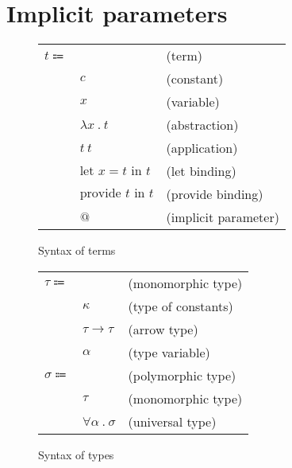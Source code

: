 \documentclass[acmlarge]{acmart}
\begin{document}
\section{Implicit parameters}

  \newcommand\entails[2]{#1 \vdash #2}
  \newcommand\hastype[2]{#1 : #2}
  \newcommand\evalsto[2]{#1 \longrightarrow #2}
  \newcommand\freevars[1]{\text{free} \left( #1 \right)}
  \newcommand\generalize[1]{\overline{\Gamma}\left( #1 \right)}

  \newcommand\labs[2]{\lambda #1 \ . \ #2}
  \newcommand\app[2]{#1 \ #2}
  \newcommand\sub[3]{#1 \left[ #2 \mapsto #3 \right]}
  \newcommand\llet[3]{\text{let } #1 = #2 \text{ in } #3}
  \newcommand\provide[2]{\text{provide } #1 \text{ in } #2}

  \newcommand\larrow[2]{#1 \rightarrow #2}
  \newcommand\lcontextarrow[3]{#1 \Rightarrow #2 \rightarrow #3}
  \newcommand\tabs[2]{\forall #1 \ . \ #2}

  \begin{figure}[h!]
    \begin{mdframed}

      \begin{tabular}{l l l}
        $t \Coloneqq $ & & (term) \\
        & $c$ & (constant) \\
        & $x$ & (variable) \\
        & $\labs{x}{t}$ & (abstraction) \\
        & $\app{t}{t}$ & (application) \\
        & $\llet{x}{t}{t}$ & (let binding) \\
        & $\provide{t}{t}$ & (provide binding) \\
        & $@$ & (implicit parameter)
      \end{tabular}

    \end{mdframed}
    \caption{Syntax of terms}
    \label{fig:terms_syntax}
  \end{figure}

  \begin{figure}[h!]
    \begin{mdframed}

      \begin{tabular}{l l l}
        $\tau \Coloneqq $ & & (monomorphic type) \\
        & $\kappa$ & (type of constants) \\
        & $\larrow{\tau}{\tau}$ & (arrow type) \\
        & $\alpha$ & (type variable) \\
        $\sigma \Coloneqq $ & & (polymorphic type) \\
        & $\tau$ & (monomorphic type) \\
        & $\tabs{\alpha}{\sigma}$ & (universal type)
      \end{tabular}

    \end{mdframed}
    \caption{Syntax of types}
    \label{fig:types_syntax}
  \end{figure}
\end{document}
